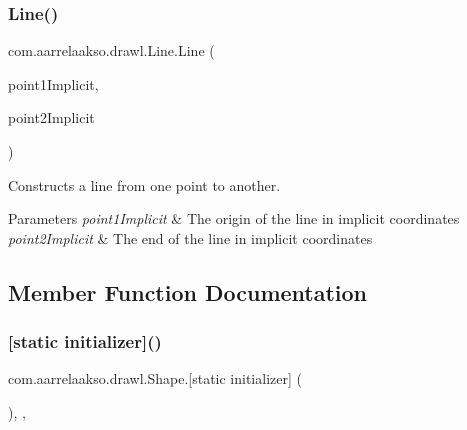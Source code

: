 \subsubsection{\texorpdfstring{Line()}{Line()}\hspace{0.1cm}{\footnotesize\ttfamily [3/3]}}
{\footnotesize\ttfamily com.\+aarrelaakso.\+drawl.\+Line.\+Line (\begin{DoxyParamCaption}\item[{@Not\+Null final \hyperlink{classcom_1_1aarrelaakso_1_1drawl_1_1_point}{Point}}]{point1\+Implicit,  }\item[{@Not\+Null final \hyperlink{classcom_1_1aarrelaakso_1_1drawl_1_1_point}{Point}}]{point2\+Implicit }\end{DoxyParamCaption})}



Constructs a line from one point to another. 


\begin{DoxyParams}{Parameters}
{\em point1\+Implicit} & The origin of the line in implicit coordinates \\
\hline
{\em point2\+Implicit} & The end of the line in implicit coordinates \\
\hline
\end{DoxyParams}


\subsection{Member Function Documentation}
\mbox{\label{classcom_1_1aarrelaakso_1_1drawl_1_1_shape_ad2adcb85374cf5d6d59429628314e8d1}} 
\subsubsection{\texorpdfstring{[static initializer]()}{[static initializer]()}}
{\footnotesize\ttfamily com.\+aarrelaakso.\+drawl.\+Shape.\mbox{[}static initializer\mbox{]} (\begin{DoxyParamCaption}{ }\end{DoxyParamCaption})\hspace{0.3cm}{\ttfamily [static]}, {\ttfamily [package]}, {\ttfamily [inherited]}}

